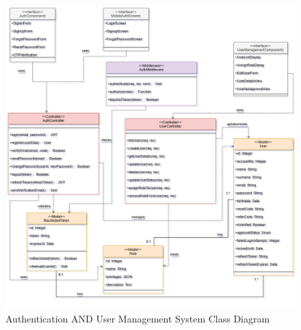 \begin{figure}[htbp]
    \centering
    \includegraphics[width=1\textwidth]{images/auth_classdiag.PNG}
    \caption{Authentication AND User Management System Class Diagram}
    \label{fig:auth-class-diagram}
\end{figure}


\newpage

